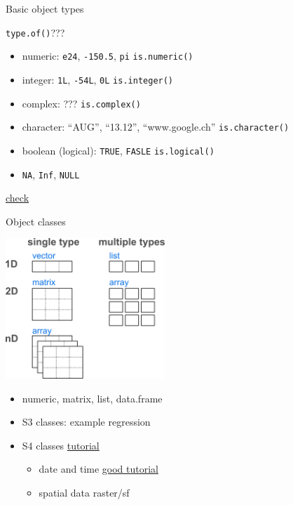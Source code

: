 \documentclass[8pt,ignorenonframetext,]{beamer}
\providecommand{\tightlist}{%
  \setlength{\itemsep}{0pt}\setlength{\parskip}{0pt}}
\begin{document}
\begin{frame}[fragile]{Basic object types}

\texttt{type.of()}???

\begin{itemize}
\tightlist
\item
  numeric: \texttt{e24}, \texttt{-150.5}, \texttt{pi}
  \texttt{is.numeric()}
\item
  integer: \texttt{1L}, \texttt{-54L}, \texttt{0L} \texttt{is.integer()}
\item
  complex: ??? \texttt{is.complex()}
\item
  character: ``AUG'', ``13.12'', ``www.google.ch''
  \texttt{is.character()}
\item
  boolean (logical): \texttt{TRUE}, \texttt{FASLE} \texttt{is.logical()}
\item
  \texttt{NA}, \texttt{Inf}, \texttt{NULL}
\end{itemize}

\href{https://swcarpentry.github.io/r-novice-inflammation/13-supp-data-structures/}{check}

\end{frame}

\begin{frame}{Object classes}

\includegraphics[width=0.45000\textwidth]{imgPres/object_types.png}

\begin{itemize}
\tightlist
\item
  numeric, matrix, list, data.frame
\item
  S3 classes: example regression
\item
  S4 classes
  \href{http://mazamascience.com/Classes/IRIS_2015/Lesson_06_WorkingWithSeismicTraces.html}{tutorial}

  \begin{itemize}
  \tightlist
  \item
    date and time
    \href{http://biostat.mc.vanderbilt.edu/wiki/pub/Main/ColeBeck/datestimes.pdf}{good
    tutorial}
  \item
    spatial data raster/sf
  \end{itemize}
\end{itemize}

\end{frame}
\end{document}
